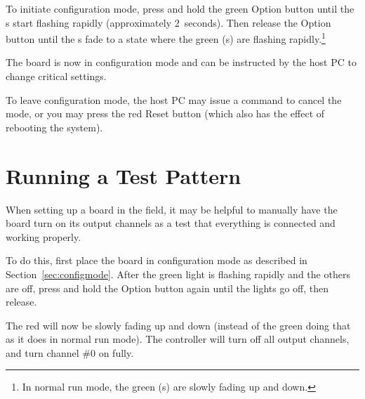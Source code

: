 \documentclass[letterpaper,twoside,onecolumn,openright,final]{memoir}
\begin{document}
To initiate configuration mode, press and hold the green Option button until the s start
flashing rapidly (approximately 2~seconds).  Then release the Option button until the s
fade to a state where the green (s) are flashing rapidly.\footnote{In normal run mode,
the green (s) are slowly fading up and down.}

The board is now in configuration mode and can be instructed by the host PC to change critical
settings.

To leave configuration mode, the host PC may issue a command to cancel the mode, or you may press
the red Reset button (which also has the effect of rebooting the system).

\section{Running a Test Pattern}
When setting up a board in the field, it may be helpful to manually have the board turn on its
output channels as a test that everything is connected and working properly.

To do this, first place the board in configuration mode as described in Section~\ref{sec:configmode}.
After the green light is flashing rapidly and the others are off, press and hold the Option button
again until the lights go off, then release.

The red  will now be slowly fading up and down (instead of the green  doing that
as it does in normal run mode).  The controller will turn off all output channels, and turn channel \#0
on fully.  
\end{document}
